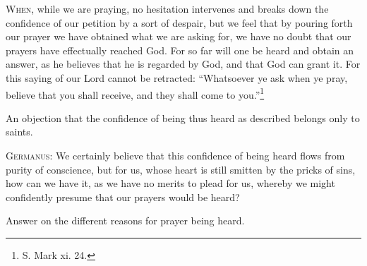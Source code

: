 \textsc{When}, while we are praying, no hesitation intervenes and breaks down the confidence of our petition by a sort of despair, but we feel that by pouring forth our prayer we have obtained what we are asking for, we have no doubt that our prayers have effectually reached God. For so far will one be heard and obtain an answer, as he believes that he is regarded by God, and that God can grant it. For this saying of our Lord cannot be retracted: “Whatsoever ye ask when ye pray, believe that you shall receive, and they shall come to you.”\footnote{S. Mark xi. 24.}


An objection that the confidence of being thus heard as described belongs only to saints.

\textsc{Germanus}: We certainly believe that this confidence of being heard flows from purity of conscience, but for us, whose heart is still smitten by the pricks of sins, how can we have it, as we have no merits to plead for us, whereby we might confidently presume that our prayers would be heard?


Answer on the different reasons for prayer being heard.

